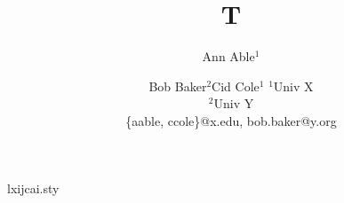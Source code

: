 \begin{filecontents*}[overwrite]{lxijcai.sty}
\def\maketitle{\par\begingroup\@maketitle\endgroup
  \let\maketitle\relax \let\@maketitle\relax
  \gdef\@author{}\gdef\@title{}}
\def\@maketitle{\vbox{\centering{\LARGE\bf \@title \par}\vskip 0.2in
  {\def\and{\unskip\thinspace{\rm ,}\enspace}%
   \def\And{\unskip\enspace{\rm and}\enspace}%
   \def\affiliations{\egroup\par\bgroup\rm}%
   \def\emails{\egroup\par\bgroup\rm}%
   \bgroup\bf\@author\egroup}}}
\end{filecontents*}
\documentclass{article}
\usepackage{lxijcai}
\title{T}
\author{Ann Able$^1$\and Bob Baker$^2$\And Cid Cole$^1$
\affiliations $^1$Univ X\\ $^2$Univ Y\\
\emails \{aable, ccole\}@x.edu, bob.baker@y.org}

\maketitle

